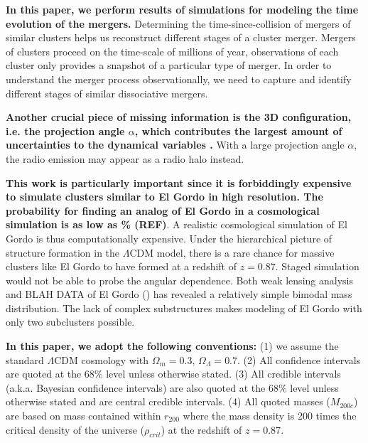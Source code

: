 \textbf{In this paper, we perform results of simulations for modeling the time
evolution of the mergers.} 
Determining the time-since-collision of mergers of similar clusters helps
us reconstruct different stages of a cluster merger.
Mergers of clusters proceed on the time-scale of millions of year,
observations of each cluster only provides a snapshot of a particular type
of merger. In order to understand the merger process observationally, 
we need to capture
and identify different stages of similar dissociative mergers. \par 

\textbf{Another crucial piece of missing information is the 3D
configuration, i.e. the projection angle $\alpha$, which contributes the
largest amount of uncertainties to the dynamical variables \citep{D13}.}
With a large projection angle $\alpha$, the radio emission may appear as a
radio halo instead.  \citep{S13}\par 
\textbf{This work is particularly important since it is forbiddingly
expensive to simulate clusters similar to El Gordo in high resolution. 
The probability for finding an analog of El Gordo in a cosmological
simulation is as low as \% (REF)}. A realistic cosmological simulation of
El Gordo is thus computationally expensive. Under the hierarchical picture
of structure formation in the $\Lambda$CDM model, there is a rare
chance for massive clusters like El Gordo to have formed at a redshift of
$z = 0.87$.  Staged simulation would not be able to probe the angular
dependence. 
Both weak lensing analysis and BLAH DATA of El Gordo (\citep{Jee13}) has revealed a
relatively simple bimodal mass distribution.  The lack of complex
substructures makes modeling of El Gordo with only two subclusters possible.

\par

\textbf{In this paper, we adopt the following conventions:} (1) we
assume the standard $\Lambda$CDM cosmology with $\Omega_{m} = 0.3$, $\Omega_{\Lambda} = 0.7$. (2) All confidence intervals are quoted at the 68\% level unless otherwise stated. 
(3) All credible intervals (a.k.a. Bayesian confidence intervals) are also
quoted at the 68\% level unless otherwise stated and are central credible
intervals. (4) All quoted masses ($M_{200c}$) are based on mass contained
within $r_{200}$ where the mass density is 200 times the critical density
of the universe ($\rho_{crit}$) at the redshift of $z = 0.87$. 
